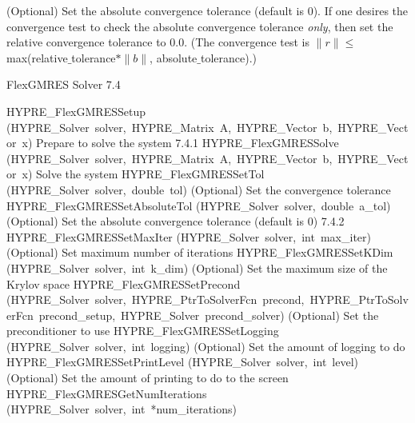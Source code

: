 \documentclass{article}
\begin{document}
\begin{cxxentry}
\begin{cxxentry}
\begin{cxxfunction}
\begin{cxxdoc}
(Optional) Set the absolute convergence tolerance (default is 0). 
If one desires
the convergence test to check the absolute convergence tolerance {\it only}, then
set the relative convergence tolerance to 0.0.  (The convergence test is 
$\|r\| \leq$ max(relative$\_$tolerance$\ast \|b\|$, absolute$\_$tolerance).)

\end{cxxdoc}
\end{cxxfunction}
\end{cxxentry}
\begin{cxxentry}
{}
        {FlexGMRES Solver}
        {}
        {
}
        {7.4}
\begin{cxxnames}
        {HYPRE\_FlexGMRESSetup}
        {(HYPRE\_Solver\ solver,\ HYPRE\_Matrix\ A,\ HYPRE\_Vector\ b,\ HYPRE\_Vector\ x)}
        {
Prepare to solve the system}
        {7.4.1}
        {HYPRE\_FlexGMRESSolve}
        {(HYPRE\_Solver\ solver,\ HYPRE\_Matrix\ A,\ HYPRE\_Vector\ b,\ HYPRE\_Vector\ x)}
        {
Solve the system}
        {}
\label{cxx.7.4.3}
        {HYPRE\_FlexGMRESSetTol}
        {(HYPRE\_Solver\ solver,\ double\ tol)}
        {
(Optional) Set the convergence tolerance}
        {}
\label{cxx.7.4.4}
        {HYPRE\_FlexGMRESSetAbsoluteTol}
        {(HYPRE\_Solver\ solver,\ double\ a\_tol)}
        {
(Optional) Set the absolute convergence tolerance (default is 0)}
        {7.4.2}
        {HYPRE\_FlexGMRESSetMaxIter}
        {(HYPRE\_Solver\ solver,\ int\ max\_iter)}
        {
(Optional) Set maximum number of iterations}
        {}
\label{cxx.7.4.5}
        {HYPRE\_FlexGMRESSetKDim}
        {(HYPRE\_Solver\ solver,\ int\ k\_dim)}
        {
(Optional) Set the maximum size of the Krylov space}
        {}
\label{cxx.7.4.6}
        {HYPRE\_FlexGMRESSetPrecond}
        {(HYPRE\_Solver\ solver,\ HYPRE\_PtrToSolverFcn\ precond,\ HYPRE\_PtrToSolverFcn\ precond\_setup,\ HYPRE\_Solver\ precond\_solver)}
        {
(Optional) Set the preconditioner to use}
        {}
\label{cxx.7.4.7}
        {HYPRE\_FlexGMRESSetLogging}
        {(HYPRE\_Solver\ solver,\ int\ logging)}
        {
(Optional) Set the amount of logging to do}
        {}
\label{cxx.7.4.8}
        {HYPRE\_FlexGMRESSetPrintLevel}
        {(HYPRE\_Solver\ solver,\ int\ level)}
        {
(Optional) Set the amount of printing to do to the screen}
        {}
\label{cxx.7.4.9}
        {HYPRE\_FlexGMRESGetNumIterations}
        {(HYPRE\_Solver\ solver,\ int\ *num\_iterations)}

\end{cxxnames}
\end{cxxentry}
\end{cxxentry}
\end{document}
